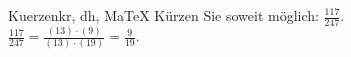\begin{MAufgabe}{Kuerzen}{kr, dh, MaTeX}
K\"urzen Sie soweit m\"oglich: $\frac{117}{247}$.\\ 
\ifLsg\MLoesung
\quad $\frac{117}{247}=\frac{(13)\cdot(9)}{(13)\cdot(19)}=\frac{9}{19}$.\else\relax\fi
 \end{MAufgabe}
